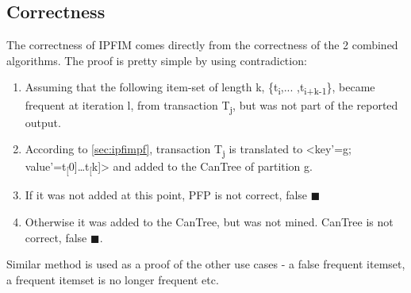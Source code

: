 \subsection{Correctness}
The correctness of IPFIM comes directly from the correctness of the 2 combined algorithms. 
The proof is pretty simple by using contradiction: 
\begin{enumerate}
	\item Assuming that the following item-set of length k,  \{t\textsubscript{i},... ,t\textsubscript{i+k-1}\}, became frequent at iteration l, from transaction T\textsubscript{j}, but was not part of the reported output.
	\item According to \autoref{sec:ipfimpf}, transaction T\textsubscript{j} is translated to <key'=g; value'={t\textsubscript[0]…t\textsubscript[k]}> and added to the CanTree of partition g.
	\item If it was not added at this point, PFP is not correct, false $\blacksquare $
	\item Otherwise it was added to the CanTree, but was not mined. CanTree is not correct, false $\blacksquare $. 
\end{enumerate}

Similar method is used as a proof of the other use cases - a false frequent itemset, a frequent itemset is no longer frequent etc.
